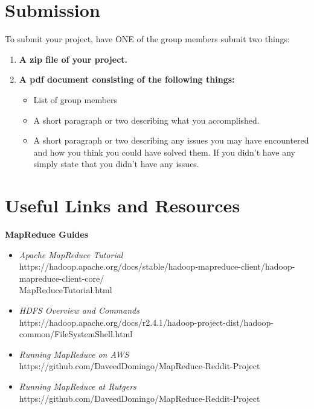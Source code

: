 \documentclass{article}
\begin{document}
\section*{Submission } 
To submit your project, have ONE of the group members submit two things:

\begin{enumerate}
\item \textbf{A zip file of your project.} 
\item \textbf{A pdf document consisting of the following things:}
	\begin{itemize}
	\item List of group members
	\item A short paragraph or two describing what you accomplished.
	\item A short paragraph or two describing any issues you may have encountered and how you think you could have solved them. If you didn't have any simply state that you didn't have any issues.
	\end{itemize}
\end{enumerate}




\section*{Useful Links and Resources} %
\textbf{MapReduce Guides}
\begin{itemize}
    \item \textit{Apache MapReduce Tutorial}\\ https://hadoop.apache.org/docs/stable/hadoop-mapreduce-client/hadoop-mapreduce-client-core/\\MapReduceTutorial.html
    \item \textit{HDFS Overview and Commands}\\ https://hadoop.apache.org/docs/r2.4.1/hadoop-project-dist/hadoop-common/FileSystemShell.html
    \item \textit{Running MapReduce on AWS}\\ https://github.com/DaveedDomingo/MapReduce-Reddit-Project
    \item \textit{Running MapReduce at Rutgers}\\ https://github.com/DaveedDomingo/MapReduce-Reddit-Project
\end{itemize}
\end{document}

